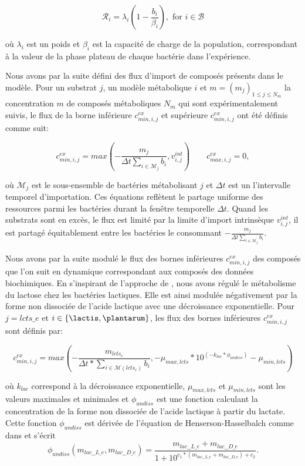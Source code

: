 \begin{equation}
\label{eq:logistic-growth}
    \mathcal{R}_{i} = \lambda_i (1-\frac{b_i}{\beta_i}), \text{ for }i \in \mathcal{B} 
\end{equation}

où $\lambda_i$ est un poids et $\beta_i$ est la capacité de charge de la population, correspondant à la valeur de la phase plateau de chaque bactérie dans l'expérience.


Nous avons par la suite défini des flux d'import de composés présents dans le modèle. Pour un substrat $j$, un modèle métabolique $i$ et $m=(m_j)_{1\leq j \leq N_m}$ la concentration $m$ de composés métaboliques $N_m$ qui sont expérimentalement suivis, le flux de la borne inférieure $c^{ex}_{min,i,j}$ et supérieure $c^{ex}_{min,i,j}$  ont été définis comme suit:

\begin{equation} 
c^{ex}_{min,i,j} = max(-\frac{m_j}{\Delta t \sum_{i\in \mathcal{M}_j} b_i},v^{int}_{i,j}) \quad \quad c^{ex}_{max,i,j} = 0,
\label{eq:usual-consumption-limitation}
\end{equation}

où $\mathcal{M}_j$ est le sous-ensemble de bactéries métabolisant $j$ et $\Delta t$ est un l'intervalle temporel d'importation. Ces équations reflètent le partage uniforme des ressources parmi les bactéries durant la fenêtre temporelle $\Delta t$. Quand les substrats sont en excès, le flux est limité par la limite d'import intrinsèque $v^{int}_{i,j}$, il est partagé équitablement entre les bactéries le consommant $-\frac{m_j}{\Delta t \sum_{i\in \mathcal{M}_j} b_i}$.

Nous avons par la suite modulé le flux des bornes inférieures $c^{ex}_{min,i,j}$ des composés que l'on suit en dynamique correspondant aux composés des données biochimiques. En s'inspirant de l'approche de \citep{Ozcan.2020}, nous avons régulé le métabolisme du lactose chez les bactéries lactiques. Elle est ainsi modulée négativement par la forme non dissociée de l'acide lactique avec une décroissance exponentielle. Pour $j=lcts\_e$ et $i \in \{\lactis, \plantarum\}$, les flux des bornes inférieures $c^{ex}_{min,i,j}$ sont définis par: 

\[ c^{ex}_{min,i,j} = max(-\frac{m_{lcts_e}}{\Delta t*\sum_{i \in \mathcal{M}(lcts_e)} b_i},-\mu_{max,lcts}*10^{(-k_{lac}*\phi_{undiss})}-\mu_{min,lcts})\]  


où $k_{lac}$ correspond à la décroissance exponentielle, $\mu_{max,lcts}$ et $\mu_{min,lcts}$ sont les valeurs maximales et minimales et $\phi_{undiss}$ est une fonction calculant la concentration de la forme non dissociée de l'acide lactique à partir du lactate. Cette fonction $\phi_{undiss}$ est dérivée de l'équation de Henserson-Hasselbalch comme dans \citep{Ozcan.2020} et s'écrit 
\begin{equation}
\phi_{undiss}(m_{lac\_\_L\_e},m_{lac\_\_D\_e}) = \frac{m_{lac\_\_L\_e}+m_{lac\_\_D\_e}}{1+ 10^{c_1 * (m_{lac\_\_L\_e}+m_{lac\_\_D\_e})+c_2}}.
\label{eq:undissociated-lactate}
\end{equation}

